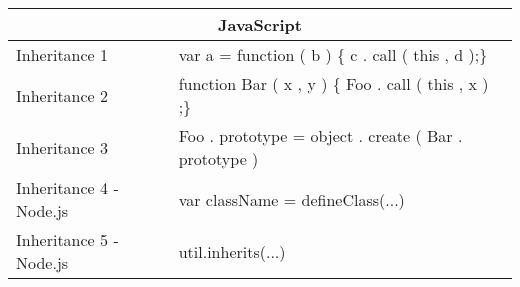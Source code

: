 \begin{table}[]
	\centering
	\label{jsPatterns}
	\begin{tabular}{|p{5cm}|p{9cm}|}
		\hline
		\multicolumn{2}{|c|}{JavaScript}                                                                                                                                                                  \\ \hline
		Inheritance 1                  & var a = function ( b ) \{    c . call ( this , d );\}                                                                                      \\ \hline
		Inheritance 2                  & function Bar   ( x , y ) \{    Foo . call ( this , x ) ;\}                                                                                 \\ \hline
		Inheritance 3                  & Foo . prototype = object . create ( Bar . prototype )                                                                                      \\ \hline
		Inheritance 4 - Node.js        & var className = defineClass(...)                                                                                                           \\ \hline
		Inheritance 5 - Node.js        & util.inherits(...)                                                                                                                         \\ \hline
	\end{tabular}
\end{table}